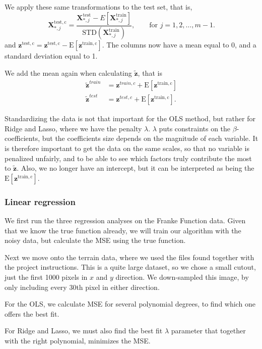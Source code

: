 \documentclass[a4paper,10pt,english]{article}
\begin{document}
We apply these same transformations to the test set, that is,
\begin{equation}
\bm{X}_{*,j}^\mathrm{test,c} = \frac{\bm{X}_{*,j}^\mathrm{test}-E[\bm{X}_{*,j}^\mathrm{train}]}{\mathrm{STD}(\bm{X}_{*,j}^\mathrm{train})}, \qquad\text{for } j=1,2,\dots, m-1.
\end{equation}
and $\bm{z}^\mathrm{test,c}= \bm{z}^\mathrm{test,c}- \mathrm{E}[\bm{z}^\mathrm{train,c}]$. The columns now have a mean equal to 0, and a standard deviation equal to 1.

We add the mean again when calculating $\bm{{\tilde z}}$, that is
\begin{align}
\bm{\tilde z}^{train} &=\bm{z}^{train,c} + \mathrm{E}[\bm{z}^\mathrm{train,c}]\\
\bm{\tilde z}^{test} &=\bm{z}^{test,c} + \mathrm{E}[\bm{z}^\mathrm{train,c}].
\end{align}

Standardizing the data is not that important for the OLS method, but rather for Ridge and Lasso, where we have the penalty $\lambda$. $\lambda$ puts constraints on the $\beta$-coefficients, but the coefficients size depends on the magnitude of each variable.
It is therefore important to get the data on the same scales, so that no variable is penalized unfairly, and to be able to see which factors truly contribute the most to $\bm{\tilde z}$. Also, we no longer have an intercept, but it can be interpreted as being the $\mathrm{E}[\bm{z}^\mathrm{train,c}]$.

\subsubsection{Linear regression}
We first run the three regression analyses on the Franke Function data. Given that we know the true function already, we will train our algorithm with the noisy data, but calculate the MSE using the true function. 

Next we move onto the terrain data, where we used the files found together with the project instructions. This is a quite large dataset, so we chose a small cutout, just the first 1000 pixels in $x$ and $y$ direction. We down-sampled this image, by only including every 30th pixel in either direction.   

For the OLS, we calculate MSE for several polynomial degrees, to find which one offers the best fit.

For Ridge and Lasso, we must also find the best fit $\lambda$ parameter that together with the right polynomial, minimizes the MSE.
\end{document}
